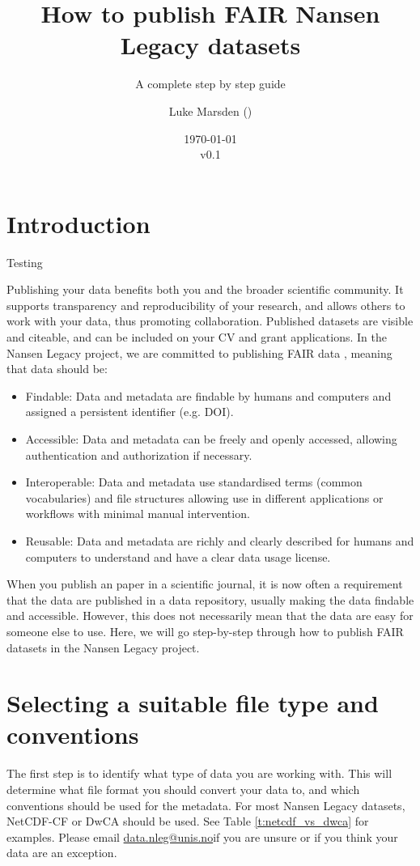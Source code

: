 \documentclass[a4paper,english, 11pt]{article}
\title{How to publish FAIR Nansen Legacy datasets}
\subtitle{A complete step by step guide}
\date{\today\\v0.1}
\author{Luke Marsden (\emailme)}
\makeatletter
\newcommand{\emailme}{\href{mailto:data.nleg@unis.no}{data.nleg@unis.no}}
\makeatother
\begin{document}
\maketitle
\tableofcontents
\pagestyle{fancy}
\newpage
\section{Introduction}
\label{s:Introduction}

Testing

Publishing your data benefits both you and the broader scientific community. It supports transparency and reproducibility of your research, and allows others to work with your data, thus promoting collaboration. Published datasets are visible and citeable, and can be included on your CV and grant applications. In the Nansen Legacy project, we are committed to publishing FAIR data \citep{wilkinson2016fair}, meaning that data should be:

\begin{itemize}
\item Findable: Data and metadata are findable by humans and computers and assigned a persistent identifier (e.g. DOI).
\item Accessible: Data and metadata can be freely and openly accessed, allowing authentication and authorization if necessary.
\item Interoperable: Data and metadata use standardised terms (common vocabularies) and file structures allowing use in different applications or workflows with minimal manual intervention. 
\item Reusable: Data and metadata are richly and clearly described for humans and computers to understand and have a clear data usage license. 
\end{itemize}

When you publish an paper in a scientific journal, it is now often a requirement that the data are published in a data repository, usually making the data findable and accessible. However, this does not necessarily mean that the data are easy for someone else to use. Here, we will go step-by-step through how to publish FAIR datasets in the Nansen Legacy project.

\section{Selecting a suitable file type and conventions}
\label{s:FileType}

The first step is to identify what type of data you are working with. This will determine what file format you should convert your data to, and which conventions should be used for the metadata. For most Nansen Legacy datasets, NetCDF-CF or DwCA should be used. See Table \ref{t:netcdf_vs_dwca} for examples. Please email \emailme if you are unsure or if you think your data are an exception.
\end{document}
